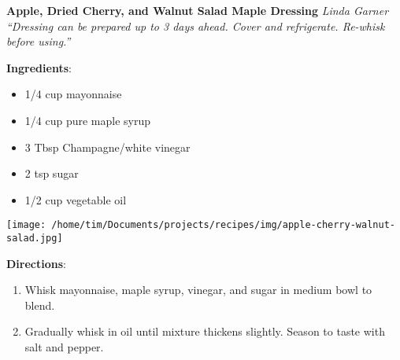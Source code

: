 \documentclass[11pt, twoside, openany]{book}
\begin{document}
\noindent\begin{minipage}[t]{\linewidth}%
{\Large\textbf{Apple, Dried Cherry, and Walnut Salad Maple Dressing}} \label{apple,-dried-cherry,-and-walnut-salad-maple-dressing}\hfill\textit{Linda Garner}\\
\textit{``Dressing can be prepared up to 3 days ahead. Cover and refrigerate. Re-whisk before using.''}\\
\noindent\begin{minipage}[t]{0.78\linewidth}%
\textbf{Ingredients}:\vspace{-3mm}
\begin{multicols}{2}
\begin{itemize}\setlength\itemsep{-1mm}
\item 1/4 cup mayonnaise
\item 1/4 cup pure maple syrup
\item 3 Tbsp Champagne/white vinegar
\item 2 tsp sugar
\item 1/2 cup vegetable oil
\end{itemize}
\end{multicols}
\end{minipage}
\noindent\begin{minipage}[t]{0.18\linewidth}
\centering \strut\vspace*{-\baselineskip}\newline
\texttt{[image: /home/tim/Documents/projects/recipes/img/apple-cherry-walnut-salad.jpg]}\\
\end{minipage}\vspace{3mm}
\textbf{Directions}:
\vspace{-3mm}\begin{enumerate}\setlength\itemsep{-1mm}
\item Whisk mayonnaise, maple syrup, vinegar, and sugar in medium bowl to blend.
\item Gradually whisk in oil until mixture thickens slightly. Season to taste with salt and pepper.
\end{enumerate}
\end{minipage}\vspace{8mm}
\end{document}

